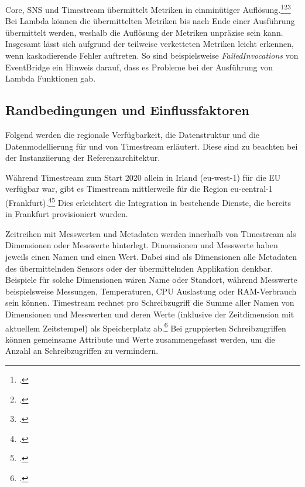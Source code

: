 \AWSIOT{} Core, \ac{SNS} und Timestream übermittelt Metriken in einminütiger Auflösung.\footcite[Vgl.][]{AmazonWebServicesInc..o.J.az}\nzitat\footcite[Vgl.][]{AmazonWebServicesInc..2021b}\nzitat\footcite[Vgl.][]{AmazonWebServicesInc..o.J.be} 
Bei Lambda können die übermittelten Metriken bis nach Ende einer Ausführung übermittelt werden, weshalb die Auflösung der Metriken unpräzise sein kann. Insgesamt lässt sich aufgrund der teilweise verketteten Metriken leicht erkennen, wenn kaskadierende Fehler auftreten. So sind beispielsweise \textit{FailedInvocations} von EventBridge ein Hinweis darauf, dass es Probleme bei der Ausführung von Lambda Funktionen gab.



\subsection{Randbedingungen und Einflussfaktoren}\label{subsection:Know-how-für-instanziierende-Architekture-B}
Folgend werden die regionale Verfügbarkeit, die Datenstruktur und die Datenmodellierung für und von Timestream erläutert. Diese sind zu beachten bei der Instanziierung der Referenzarchitektur. 

Während Timestream zum Start 2020 allein in Irland (eu-west-1) für die EU verfügbar war, gibt es Timestream mittlerweile für die Region eu-central-1 (Frankfurt).\footcite[Vgl.][]{AmazonWebServicesInc..2020g}\nzitat\footcite[Vgl.][]{AmazonWebServicesInc..o.J.q} Dies erleichtert die Integration in bestehende Dienste, die bereits in Frankfurt provisioniert wurden.

Zeitreihen mit Messwerten und Metadaten werden innerhalb von Timestream als Dimensionen oder Messwerte hinterlegt. Dimensionen und Messwerte haben jeweils einen Namen und einen Wert. Dabei sind als Dimensionen alle Metadaten des übermittelnden Sensors oder der übermittelnden Applikation denkbar. Beispiele für solche Dimensionen wären Name oder Standort, während Messwerte beispielsweise \coo{} Messungen, Temperaturen, CPU Auslastung oder \ac{RAM}-Verbrauch sein können. Timestream rechnet pro Schreibzugriff die Summe aller Namen von Dimensionen und Messwerten und deren Werte (inklusive der Zeitdimension mit aktuellem Zeitstempel) als Speicherplatz ab.\footcite[Vgl. auch im Folgenden][]{AmazonWebServicesInc..o.J.bs} Bei gruppierten Schreibzugriffen können gemeinsame Attribute und Werte zusammengefasst werden, um die Anzahl an Schreibzugriffen zu vermindern.

